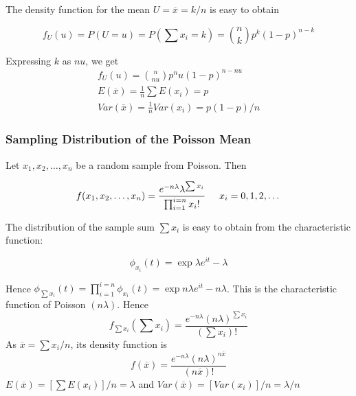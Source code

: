 \documentclass{article}
\begin{document}
The density function for the mean \(U=\overline{x}=k/n\) is easy to obtain

\begin{equation*}
    f_U(u)=P(U=u)=P(\sum x_i=k)=\binom{n}{k} p^k(1-p)^{n-k}
\end{equation*}

Expressing $k$ as $nu$, we get
\begin{equation*}
    \begin{split}
        f_U(u)=\binom{n}{nu} p^nu(1-p)^{n-nu}\\
        E(\overline{x})=\frac{1}{n}\sum E(x_i)=p\\
        Var(\overline{x})=\frac{1}{n} Var(x_i)=p(1-p)/n
    \end{split}
\end{equation*}

\subsubsection{Sampling Distribution of the Poisson Mean}

Let \(x_1,x_2,\dots,x_n\) be a random sample from Poisson. Then

\begin{equation*}
    f(x_1,x_2,\dots,x_n)=\frac{e^{-n\lambda}\lambda^{\sum x_i}}{\prod_{i=1}^{i=n} x_i!} \hspace{0.5cm} x_i=0,1,2,\dots
\end{equation*}

The distribution of the sample sum \(\sum x_i\) is easy to obtain from the characteristic function:

\begin{equation*}
    \phi_{x_i}(t)=\exp{\lambda e^{it}-\lambda}
\end{equation*}

Hence \(\phi_{\sum x_i}(t)=\prod_{i=1}^{i=n}\phi_{x_i}(t)=\exp{n\lambda e^{it}-n\lambda}\). This is the characteristic function of Poisson $(n\lambda)$. Hence
\begin{equation*}
    f_{\sum x_i} (\sum x_i)=\frac{e^{-n\lambda} (n\lambda)^{\sum x_i}}{(\sum x_i)!}
\end{equation*}
As \(\overline{x}=\sum x_i/n\), its density function is
\begin{equation*}
    f(\overline{x})=\frac{e^{-n\lambda} (n\lambda)^{n \overline{x}}}{(n \overline{x})!}
\end{equation*}
\(E(\overline{x})=[\sum E(x_i)]/n=\lambda\) and \(Var(\overline{x})=[Var(x_i)]/n=\lambda/n\)
\end{document}
